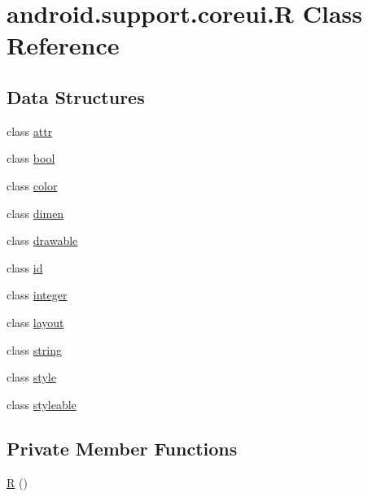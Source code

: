 \hypertarget{classandroid_1_1support_1_1coreui_1_1_r}{}\section{android.\+support.\+coreui.\+R Class Reference}
\label{classandroid_1_1support_1_1coreui_1_1_r}
\subsection*{Data Structures}
\begin{DoxyCompactItemize}
\item 
class \mbox{\hyperlink{classandroid_1_1support_1_1coreui_1_1_r_1_1attr}{attr}}
\item 
class \mbox{\hyperlink{classandroid_1_1support_1_1coreui_1_1_r_1_1bool}{bool}}
\item 
class \mbox{\hyperlink{classandroid_1_1support_1_1coreui_1_1_r_1_1color}{color}}
\item 
class \mbox{\hyperlink{classandroid_1_1support_1_1coreui_1_1_r_1_1dimen}{dimen}}
\item 
class \mbox{\hyperlink{classandroid_1_1support_1_1coreui_1_1_r_1_1drawable}{drawable}}
\item 
class \mbox{\hyperlink{classandroid_1_1support_1_1coreui_1_1_r_1_1id}{id}}
\item 
class \mbox{\hyperlink{classandroid_1_1support_1_1coreui_1_1_r_1_1integer}{integer}}
\item 
class \mbox{\hyperlink{classandroid_1_1support_1_1coreui_1_1_r_1_1layout}{layout}}
\item 
class \mbox{\hyperlink{classandroid_1_1support_1_1coreui_1_1_r_1_1string}{string}}
\item 
class \mbox{\hyperlink{classandroid_1_1support_1_1coreui_1_1_r_1_1style}{style}}
\item 
class \mbox{\hyperlink{classandroid_1_1support_1_1coreui_1_1_r_1_1styleable}{styleable}}
\end{DoxyCompactItemize}
\subsection*{Private Member Functions}
\begin{DoxyCompactItemize}
\item 
\mbox{\hyperlink{classandroid_1_1support_1_1coreui_1_1_r_a3da75b0c0738bf933a54234a5d209dbd}{R}} ()
\end{DoxyCompactItemize}


